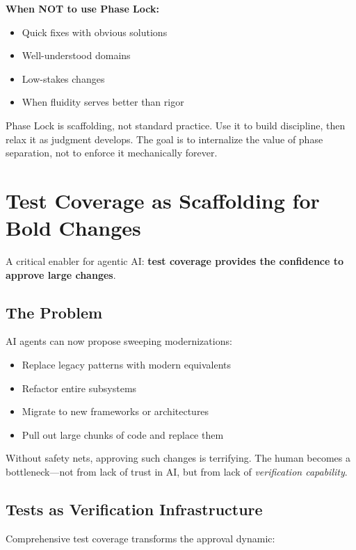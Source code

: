 \textbf{When NOT to use Phase Lock:}
\begin{itemize}
    \item Quick fixes with obvious solutions
    \item Well-understood domains
    \item Low-stakes changes
    \item When fluidity serves better than rigor
\end{itemize}

Phase Lock is scaffolding, not standard practice. Use it to build discipline, then relax it as judgment develops. The goal is to internalize the value of phase separation, not to enforce it mechanically forever.

\section{Test Coverage as Scaffolding for Bold Changes}\label{sec:test-scaffolding}

A critical enabler for agentic AI: \textbf{test coverage provides the confidence to approve large changes}.

\subsection{The Problem}

AI agents can now propose sweeping modernizations:
\begin{itemize}
    \item Replace legacy patterns with modern equivalents
    \item Refactor entire subsystems
    \item Migrate to new frameworks or architectures
    \item Pull out large chunks of code and replace them
\end{itemize}

Without safety nets, approving such changes is terrifying. The human becomes a bottleneck---not from lack of trust in AI, but from lack of \emph{verification capability}.

\subsection{Tests as Verification Infrastructure}

Comprehensive test coverage transforms the approval dynamic:

